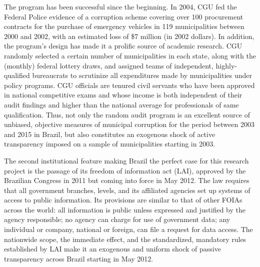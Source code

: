 \documentclass[11pt]{article}
\begin{document}
The program has been successful since the beginning. In 2004, CGU fed the Federal Police evidence of a corruption scheme covering over 100 procurement contracts for the purchase of emergency vehicles in 119 municipalities between 2000 and 2002, with an estimated loss of \$7 million (in 2002 dollars). In addition, the program's design has made it a prolific source of academic research. CGU randomly selected a certain number of municipalities in each state, along with the (monthly) federal lottery draws, and assigned teams of independent, highly-qualified bureaucrats to scrutinize all expenditures made by municipalities under policy programs. CGU officials are tenured civil servants who have been approved in national competitive exams and whose income is both independent of their audit findings and higher than the national average for professionals of same qualification. Thus, not only the random audit program is an excellent source of unbiased, objective measures of municipal corruption for the period between 2003 and 2015 in Brazil, but also constitutes an exogenous shock of active transparency imposed on a sample of municipalities starting in 2003.

The second institutional feature making Brazil the perfect case for this research project is the passage of its freedom of information act (LAI), approved by the Brazilian Congress in 2011 but coming into force in May 2012. The law requires that all government branches, levels, and its affiliated agencies set up systems of access to public information. Its provisions are similar to that of other FOIAs across the world: all information is public unless expressed and justified by the agency responsible; no agency can charge for use of government data; any individual or company, national or foreign, can file a request for data access. The nationwide scope, the immediate effect, and the standardized, mandatory rules established by LAI make it an exogenous and uniform shock of passive transparency across Brazil starting in May 2012.
\end{document}
